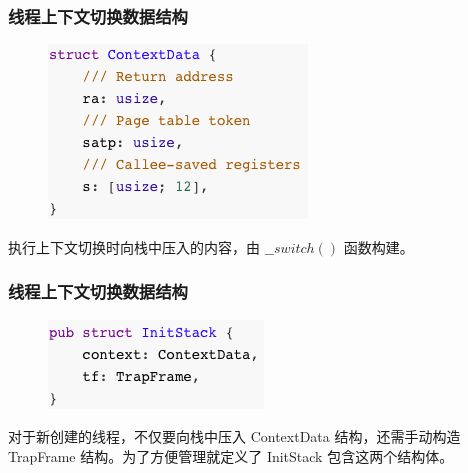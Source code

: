 % 
% 
% 
% 
% 
% 
% 
% 

\begin{frame}[fragile]
    \frametitle{线程上下文切换数据结构}
    \begin{figure}
    \includegraphics[width=0.4\linewidth]{figs/struct-ContextData.png}
    \end{figure}

执行上下文切换时向栈中压入的内容，由 $\_\_switch()$ 函数构建。

\end{frame}

% 
% 
% 

\begin{frame}[fragile]
    \frametitle{线程上下文切换数据结构}
    \begin{figure}
    \includegraphics[width=0.35\linewidth]{figs/struct-InitStack.png}
    \end{figure}

对于新创建的线程，不仅要向栈中压入 ContextData 结构，还需手动构造 TrapFrame 结构。为了方便管理就定义了 InitStack 包含这两个结构体。

\end{frame}

